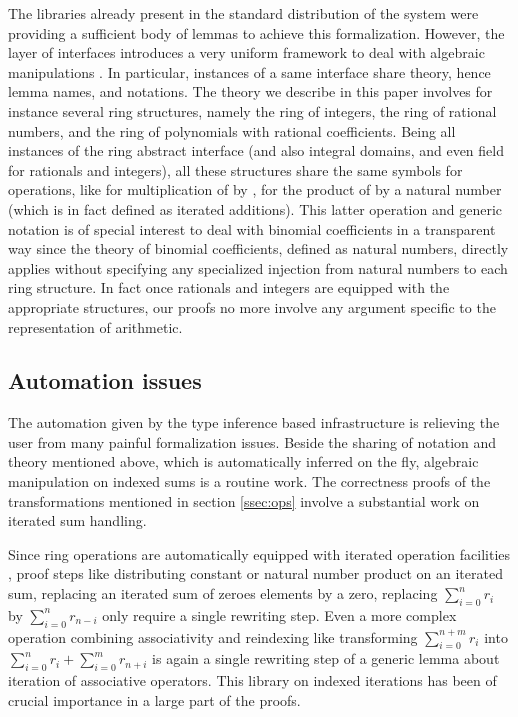 \documentclass{mscs}
\begin{document}
The libraries already present in the standard distribution of the
system were providing a sufficient body of lemmas to achieve this
formalization. However, the \ssr{} layer of interfaces introduces a very
uniform framework to deal with algebraic manipulations \cite{packagingmathstructures}.   In particular,
instances of a same interface share theory, hence lemma names, and
notations.  The theory we describe in this paper involves for instance
several ring structures, namely the ring of integers, the ring
of rational numbers, and the ring of polynomials with rational
coefficients. Being all instances of the ring abstract interface
(and also integral domains, and even field for rationals and integers), all
these structures share the same symbols for operations, like
 for multiplication of  by ,  for the
product of  by a natural number (which is in fact defined as
iterated additions).
This latter operation and generic notation is of special interest to
deal with binomial coefficients in a transparent way since the theory
of binomial coefficients, defined as natural numbers, directly applies
without specifying any specialized injection from natural numbers to
each ring structure. In fact once rationals and integers are equipped
with the appropriate structures, our proofs no more involve any
argument specific to the representation of arithmetic.







\subsection{Automation issues}

The automation given by the type inference based infrastructure is
relieving the user from many painful formalization issues. Beside the
sharing of notation and theory mentioned above, which is automatically
inferred on the fly, algebraic manipulation on indexed sums is a
routine work. The correctness proofs of the transformations mentioned
in section \ref{ssec:ops} involve a substantial work on iterated sum
handling.

Since ring operations are automatically equipped with iterated
operation facilities \cite{BGOBP:BIG08}, proof steps like distributing constant or
natural number product on an iterated sum, replacing an iterated sum
of zeroes elements by a zero, replacing $\sum_{i = 0}^n r_i$ by
$\sum_{i = 0}^n r_{n - i}$ only require a single rewriting step.
Even a  more complex operation combining associativity and reindexing
like transforming $\sum_{i = 0}^{n + m} r_i$ into
$\sum_{i = 0}^{n} r_i + \sum_{i = 0}^{m} r_{n + i}$ is again a single
rewriting step of a generic lemma about iteration of associative
operators. This \ssr{} library on indexed iterations has been of crucial
importance in a large part of the proofs.
\end{document}
